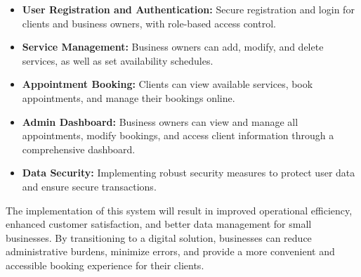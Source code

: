 \begin{itemize}
    \item \textbf{User Registration and Authentication:} Secure registration and login for clients and business owners, with role-based access control.
    \item \textbf{Service Management:} Business owners can add, modify, and delete services, as well as set availability schedules.
    \item \textbf{Appointment Booking:} Clients can view available services, book appointments, and manage their bookings online.
    \item \textbf{Admin Dashboard:} Business owners can view and manage all appointments, modify bookings, and access client information through a comprehensive dashboard.
    \item \textbf{Data Security:} Implementing robust security measures to protect user data and ensure secure transactions.
\end{itemize}

The implementation of this system will result in improved operational efficiency, enhanced customer satisfaction, and better data management for small businesses. By transitioning to a digital solution, businesses can reduce administrative burdens, minimize errors, and provide a more convenient and accessible booking experience for their clients.


